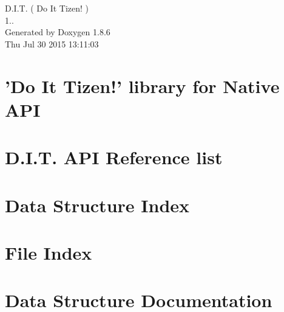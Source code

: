 \documentclass[twoside]{book}
\newcommand{\clearemptydoublepage}{%
  \newpage{\pagestyle{empty}\cleardoublepage}%
}
\begin{document}
\begin{titlepage}
\vspace*{7cm}
\begin{center}%
{\Large D.\-I.\-T. ( Do It Tizen! ) \\[1ex]\large 1.. }\\
\vspace*{1cm}
{\large Generated by Doxygen 1.8.6}\\
\vspace*{0.5cm}
{\small Thu Jul 30 2015 13:11:03}\\
\end{center}
\end{titlepage}
\clearemptydoublepage
\tableofcontents
\clearemptydoublepage
{}

\chapter{'Do It Tizen!' library for Native A\-P\-I}
\label{index}
\chapter{D.\-I.\-T. A\-P\-I Reference list}
\label{md__Users_CDJ_Dropbox_DJ_SSM_DIT_doxygen_DIT_API_Reference_list}

\chapter{Data Structure Index}

\chapter{File Index}

\chapter{Data Structure Documentation}




























\end{document}
